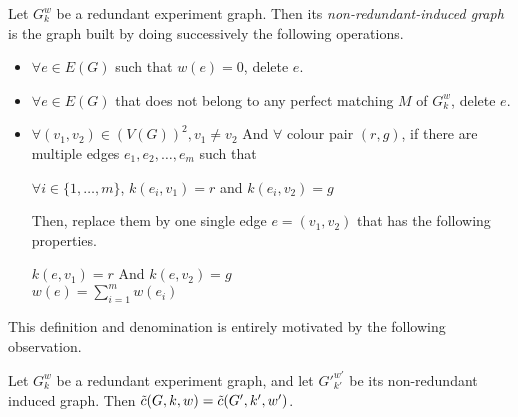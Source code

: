 \begin{definition}
    \label{def:non_redundant_induced_subgraph}
    Let $G_k^w$ be a redundant experiment graph.
    Then its \textit{non-redundant-induced graph} is the graph built by doing successively the following operations.

    \begin{itemize}
        \item $\forall e \in E(G)$ such that $w(e) = 0$, delete $e$.
        \item $\forall e \in E(G)$ that does not belong to any perfect matching $M$ of $G_k^w$, delete $e$.
        \item $\forall (v_1, v_2) \in (V(G))^2, v_1 \neq v_2$ And $\forall$ colour pair $(r, g)$, if there are multiple edges $e_1, e_2, \dots, e_m$ such that
        
        \begin{center}
            $\forall i \in \{1, \dots, m\}$, $k(e_i, v_1) = r$ and $k(e_i, v_2) = g$
        \end{center}
        Then, replace them by one single edge $e = (v_1, v_2)$ that has the following properties.
        
        \begin{center}
            $k(e, v_1) = r$ And $k(e, v_2) = g$ \\
            $w(e) = \sum\limits_{i = 1}^m w(e_i)$
        \end{center}
        
    \end{itemize}
    
\end{definition}

This definition and denomination is entirely motivated by the following observation.

\begin{observation}
    \label{obs:non_redundancy_enough}
    Let $G_k^w$ be a redundant experiment graph, and let ${G'}_{k'}^{w'}$ be its non-redundant induced graph. Then $\Tilde{c}(G, k, w) = \Tilde{c}(G', k', w')$.
\end{observation}


